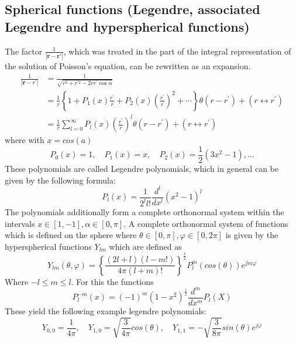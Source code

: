 \subsection{Spherical functions (Legendre, associated Legendre and hyperspherical functions)}
The factor $\displaystyle \frac{1}{|\textbf{r}-\textbf{r}'|}$, which was treated in the part of the integral representation of the solution of Poisson's equation, can be rewritten as an expansion.
\begin{equation}
    \begin{aligned}
    \frac{1}{\left|\mathbf{r}-r^{\prime}\right|} &=\frac{1}{\sqrt{r^{2}+r^{\prime 2}-2 r r^{\prime} \cos \alpha}} \\
    &=\frac{1}{r}\left\{1+P_{1}(x) \frac{r^{\prime}}{r}+P_{2}(x)\left(\frac{r^{\prime}}{r}\right)^{2}+\cdots\right\} \theta\left(r-r^{\prime}\right)+\left(r \leftrightarrow r^{\prime}\right) \\
    &=\frac{1}{r} \sum_{l=0}^{\infty} P_{l}(x)\left(\frac{r^{\prime}}{r}\right)^{l} \theta\left(r-r^{\prime}\right)+\left(r \leftrightarrow r^{\prime}\right)
    \end{aligned}
\end{equation}
where with $x = cos(a)$ 
\begin{equation}
    P_0(x) = 1, \quad P_1(x) = x,\quad P_2(x) = \frac{1}{2}(3x^2-1),...
\end{equation}
These polynomials are called Legendre polynomials, which in general can be given by the following formula:
\begin{equation}
    P_l(x) = \frac{1}{2^ll!}\frac{d^l}{dx^l}(x^2-1)^l
\end{equation}
The polynomials additionally form a complete orthonormal system within the intervals $ x\in [1,-1], \alpha \in [0,\pi]$. A complete orthonormal system of functions
which is defined on the sphere where $\theta \in [0,\pi], \varphi \in [0, 2\pi]$ is given by the hyperspherical functions $Y_{lm}$ which are defined as
\begin{equation}
    Y_{lm}(\theta, \varphi) = \left\{ \frac{(2l+l)(l-m!)}{4\pi(l+m)!} \right\}^{\frac{1}{2}}P_l^m(cos(\theta))e^{jm\varphi}
\end{equation}
Where $-l \leq m \leq l$. For this the functions
\begin{equation}
    P_l^{-m}(x)= (-1)^m(1-x^2)^{\frac{1}{2}}\frac{d^m}{dx^m}P_l(X)
\end{equation}
These yield the following example legendre polynomials:
\begin{equation}
    Y_{0,0} = \frac{1}{4\pi}, \quad Y_{1,0} =\sqrt{\frac{3}{4\pi}}cos(\theta), \quad Y_{1,1}= -\sqrt{\frac{3}{8\pi}}sin(\theta)e^{j\varphi}
\end{equation}
